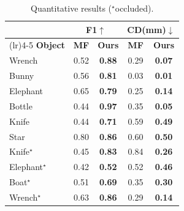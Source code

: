 \begin{table}
  \vspace{-1em}
  \small
  \caption{Quantitative results ($^\star$occluded).}
  \label{tab:quant-result}
  \centering
  \begin{tabularx}{0.43\textwidth}{>{\raggedright\arraybackslash}p{1.4cm} *{4}{c}}
    \toprule
    \textbf{ } & \multicolumn{2}{c}{\textbf{F1}$\uparrow$} & \multicolumn{2}{c}{\textbf{CD}(mm)$\downarrow$} \\
    \cmidrule(lr){2-3} \cmidrule(lr){4-5}
    \textbf{Object} & \textbf{MF} & \textbf{Ours} & \textbf{MF} & \textbf{Ours} \\
    \midrule
    Wrench    & 0.52 & \textbf{0.88} & 0.29 & \textbf{0.07} \\
    Bunny    & 0.56 & \textbf{0.81} & 0.03 & \textbf{0.01} \\
    Elephant   & 0.65 & \textbf{0.79} & 0.25 & \textbf{0.14} \\
    Bottle   & 0.44 & \textbf{0.97} & 0.35 & \textbf{0.05} \\
    Knife    & 0.44 & \textbf{0.71} & 0.59 & \textbf{0.49} \\
    Star    & 0.80 & \textbf{0.86} & 0.60 & \textbf{0.50} \\
    Knife$^\star$  & 0.45 & \textbf{0.83} & 0.84 & \textbf{0.26} \\
    Elephant$^\star$ & 0.42 & \textbf{0.52} & 0.52 & \textbf{0.46} \\
    Boat$^\star$  & 0.51 & \textbf{0.69} & 0.35 & \textbf{0.30} \\
    Wrench$^\star$ & 0.63 & \textbf{0.86} & 0.29 & \textbf{0.14} \\
    \bottomrule
  \end{tabularx}
  \vspace{-1em}
\end{table}
